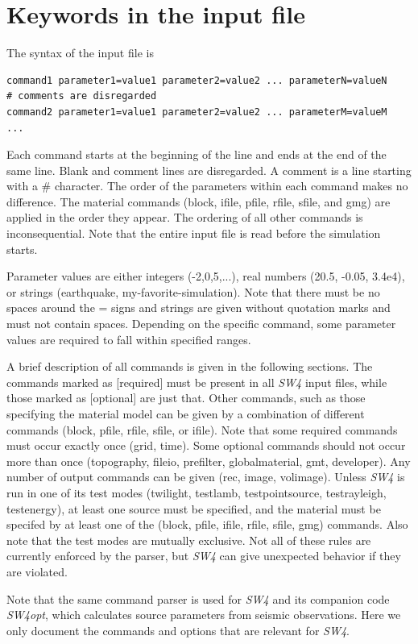 \documentclass[11pt]{report}
\begin{document}
\chapter{Keywords in the input file}\label{chap:keywords}
The syntax of the input file is
\begin{verbatim}
command1 parameter1=value1 parameter2=value2 ... parameterN=valueN
# comments are disregarded
command2 parameter1=value1 parameter2=value2 ... parameterM=valueM
...
\end{verbatim}
Each command starts at the beginning of the line and ends at the end of the same line. Blank and
comment lines are disregarded. A comment is a line starting with a \# character. The order of the
parameters within each command makes no difference. The material commands (block, ifile, pfile, rfile, sfile, and gmg)
are applied in the order they appear. The ordering of all other commands is inconsequential. Note
that the entire input file is read before the simulation starts.

Parameter values are either integers (-2,0,5,...), real numbers (20.5, -0.05, 3.4e4), or strings
(earthquake, my-favorite-simulation). Note that there must be no spaces around the = signs and
strings are given without quotation marks and must not contain spaces. Depending on the specific
command, some parameter values are required to fall within specified ranges.

A brief description of all commands is given in the following sections. The commands marked as
[required] must be present in all \emph{SW4} input files, while those marked as [optional] are just
that. Other commands, such as those specifying the material model can be given by a combination of
different commands (block, pfile, rfile, sfile, or ifile). Note that some required commands must occur
exactly once (grid, time). Some optional commands should not occur more than once (topography,
fileio, prefilter, globalmaterial, gmt, developer). Any number of output commands can be given (rec,
image, volimage). Unless \emph{SW4} is run in one of its test modes (twilight, testlamb,
testpointsource, testrayleigh, testenergy), at least one source must be specified, and the material
must be specifed by at least one of the (block, pfile, ifile, rfile, sfile, gmg) commands. Also note that the
test modes are mutually exclusive. Not all of these rules are currently enforced by the parser, but
\emph{SW4} can give unexpected behavior if they are violated.

Note that the same command parser is used for \emph{SW4} and its companion code \emph{SW4opt}, which
calculates source parameters from seismic observations. Here we only document the commands and options
that are relevant for \emph{SW4}.
\end{document}
